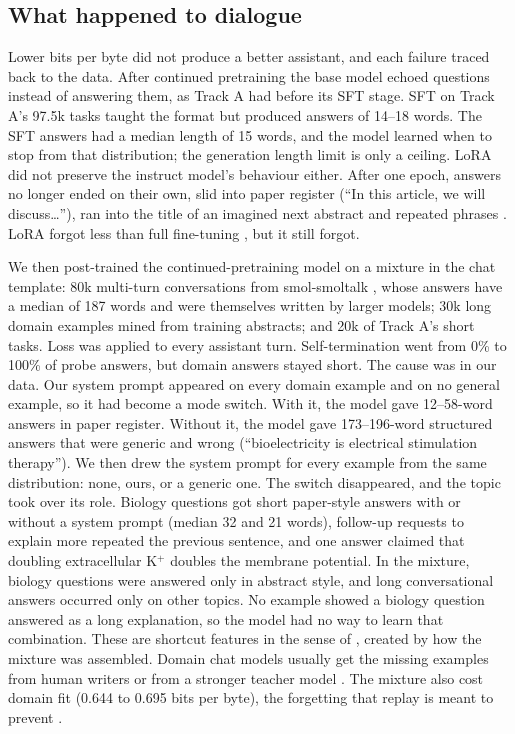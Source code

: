 \documentclass[11pt]{article}
\begin{document}
\subsection{What happened to dialogue}
Lower bits per byte did not produce a better assistant, and each failure
traced back to the data. After continued pretraining the base model
echoed questions instead of answering them, as Track A had before its SFT
stage. SFT on Track A's 97.5k tasks taught the format but produced answers
of 14--18 words. The SFT answers had a median length of 15 words, and the
model learned when to stop from that distribution; the generation length
limit is only a ceiling. LoRA did not preserve the instruct model's
behaviour either. After one epoch, answers no longer ended on their own,
slid into paper register (``In this article, we will discuss\dots''), ran
into the title of an imagined next abstract and repeated phrases
\citep{holtzman2020curious}. LoRA forgot less than full fine-tuning
\citep{biderman2024lora}, but it still forgot.

We then post-trained the continued-pretraining model on a mixture in the chat template:
80k multi-turn conversations from smol-smoltalk \citep{allal2025smollm2},
whose answers have a median of 187 words and were themselves written by larger
models; 30k long domain examples mined from
training abstracts; and 20k of Track A's short tasks. Loss was applied to every assistant
turn. Self-termination went from 0\% to 100\% of probe answers, but domain
answers stayed short. The cause was in our data. Our system prompt
appeared on every domain example and on no general example, so it had
become a mode switch. With it, the model gave 12--58-word answers in paper
register. Without it, the model gave 173--196-word structured answers that
were generic and wrong (``bioelectricity is electrical stimulation
therapy''). We then drew the system prompt for every example from the same
distribution: none, ours, or a generic one. The switch disappeared, and the
topic took over its role. Biology questions got short paper-style answers
with or without a system prompt (median 32 and 21 words), follow-up
requests to explain more repeated the previous sentence, and one answer
claimed that doubling extracellular K$^+$ doubles the membrane potential.
In the mixture, biology questions were answered only in abstract style, and
long conversational answers occurred only on other topics. No example
showed a biology question answered as a long explanation, so the model had
no way to learn that combination. These are shortcut features in the sense
of \citet{geirhos2020shortcut}, created by how the mixture was assembled.
Domain chat models usually get the missing examples from human writers or
from a stronger teacher model \citep{ouyang2022training,mukherjee2023orca,wu2024pmcllama}.
The mixture also cost domain fit (0.644 to 0.695 bits per byte), the
forgetting that replay is meant to prevent \citep{ibrahim2024simple}.
\end{document}
